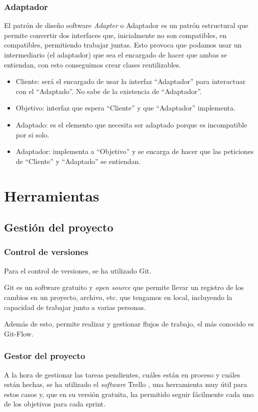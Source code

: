 \subsubsection{Adaptador}
El patrón de diseño software \textit{Adapter} o Adaptador \cite{apuntesDMStema2} es un patrón estructural que permite convertir dos interfaces que, inicialmente no son compatibles, en compatibles, permitiendo trabajar juntas. Esto provoca que podamos usar un intermediario (el adaptador) que sea el encargado de hacer que ambas se entiendan, con esto conseguimos crear clases reutilizables.

\begin{itemize}
    \item Cliente: será el encargado de usar la interfaz ``Adaptador'' para interactuar con el ``Adaptado''. No sabe de la existencia de ``Adaptador''.
    \item Objetivo: interfaz que espera ``Cliente'' y que ``Adaptador'' implementa.
    \item Adaptado: es el elemento que necesita ser adaptado porque es incompatible por si solo.
    \item Adaptador: implementa a ``Objetivo'' y se encarga de hacer que las peticiones de ``Cliente'' y ``Adaptado'' se entiendan.
\end{itemize}

\section{Herramientas}
\subsection{Gestión del proyecto}
\subsubsection{Control de versiones}
Para el control de versiones, se ha utilizado Git. 

Git es un software gratuito y \textit{open source} que permite llevar un registro de los cambios en un proyecto, archivo, etc. que tengamos en local, incluyendo la capacidad de trabajar junto a varias personas.

Además de esto, permite realizar y gestionar flujos de trabajo, el más conocido es Git-Flow.

\subsubsection{Gestor del proyecto}
A la hora de gestionar las tareas pendientes, cuáles están en proceso y cuáles están hechas, se ha utilizado el \textit{software} Trello \cite{trello}, una herramienta muy útil para estos casos y, que en su versión gratuita, ha permitido seguir fácilmente cada uno de los objetivos para cada sprint. 

